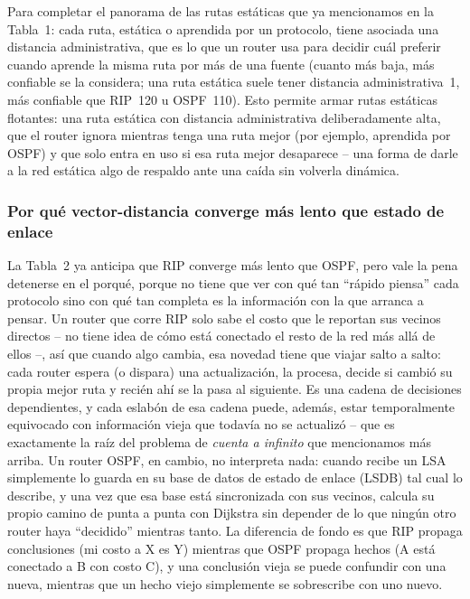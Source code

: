 \documentclass[11pt,a4paper]{article}
\begin{document}
Para completar el panorama de las rutas est\'aticas que ya mencionamos en la Tabla~1: cada ruta, est\'atica o aprendida por un protocolo, tiene asociada una distancia administrativa, que es lo que un router usa para decidir cu\'al preferir cuando aprende la misma ruta por m\'as de una fuente (cuanto m\'as baja, m\'as confiable se la considera; una ruta est\'atica suele tener distancia administrativa~1, m\'as confiable que RIP~120 u OSPF~110). Esto permite armar rutas est\'aticas flotantes: una ruta est\'atica con distancia administrativa deliberadamente alta, que el router ignora mientras tenga una ruta mejor (por ejemplo, aprendida por OSPF) y que solo entra en uso si esa ruta mejor desaparece -- una forma de darle a la red est\'atica algo de respaldo ante una ca\'ida sin volverla din\'amica.

\subsubsection*{Por qu\'e vector-distancia converge m\'as lento que estado de enlace}

La Tabla~2 ya anticipa que RIP converge m\'as lento que OSPF, pero vale la pena detenerse en el porqu\'e, porque no tiene que ver con qu\'e tan ``r\'apido piensa'' cada protocolo sino con qu\'e tan completa es la informaci\'on con la que arranca a pensar. Un router que corre RIP solo sabe el costo que le reportan sus vecinos directos -- no tiene idea de c\'omo est\'a conectado el resto de la red m\'as all\'a de ellos --, as\'i que cuando algo cambia, esa novedad tiene que viajar salto a salto: cada router espera (o dispara) una actualizaci\'on, la procesa, decide si cambi\'o su propia mejor ruta y reci\'en ah\'i se la pasa al siguiente. Es una cadena de decisiones dependientes, y cada eslab\'on de esa cadena puede, adem\'as, estar temporalmente equivocado con informaci\'on vieja que todav\'ia no se actualiz\'o -- que es exactamente la ra\'iz del problema de \textit{cuenta a infinito} que mencionamos m\'as arriba. Un router OSPF, en cambio, no interpreta nada: cuando recibe un LSA simplemente lo guarda en su base de datos de estado de enlace (LSDB) tal cual lo describe, y una vez que esa base est\'a sincronizada con sus vecinos, calcula su propio camino de punta a punta con Dijkstra sin depender de lo que ning\'un otro router haya ``decidido'' mientras tanto. La diferencia de fondo es que RIP propaga conclusiones (mi costo a X es Y) mientras que OSPF propaga hechos (A est\'a conectado a B con costo C), y una conclusi\'on vieja se puede confundir con una nueva, mientras que un hecho viejo simplemente se sobrescribe con uno nuevo.
\end{document}
